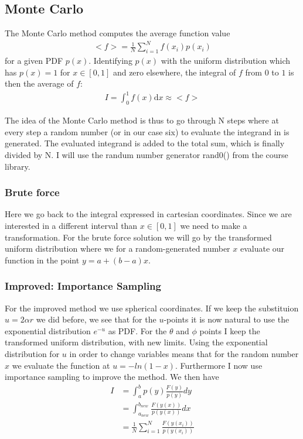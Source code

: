 \documentclass[norsk,a4paper,11pt]{article}
\begin{document}
\subsection{Monte Carlo}
The Monte Carlo method computes the average function value
\begin{align}
    <f> = \frac{1}{N} \sum_{i=1}^{N} f(x_i)p(x_i)
\end{align}
for a given PDF $p(x)$. Identifying $p(x)$ with the uniform distribution which has $p(x)=1$ for $x\in [0, 1]$ and zero elsewhere,
the integral of $f$ from $0$ to $1$ is then the average of $f$:
\begin{align}
    I = \int_0^1 f(x) \mathrm{d}x \approx <f>
\end{align}

The idea of the Monte Carlo method is thus to go through N steps where at every step a random number (or in our case six)
to evaluate the integrand in is generated. The evaluated integrand is added to the total sum, which is finally divided by N.
I will use the randum number generator rand0() from the course library.

\subsubsection{Brute force}
Here we go back to the integral expressed in cartesian coordinates. Since we are interested in a different interval than
$x \in [0,1]$ we need to make a transformation. For the brute force solution we will go by the transformed uniform distribution where
we for a random-generated number $x$ evaluate our function in the point $y = a + (b-a)x$.

\subsubsection{Improved: Importance Sampling}
For the improved method we use spherical coordinates. If we keep the substituion $u=2\alpha r$ we did before,
we see that for the $u$-points it is now natural to use the exponential distribution $e^{-u}$ as PDF. For the
$\theta$ and $\phi$ points I keep the transformed uniform distribution, with new limits.
Using the exponential distribution for $u$ in order to change variables means that for the random number $x$ we evaluate the
function at $u = -ln(1-x)$.
Furthermore I now use importance sampling to improve the method. 
We then have
\begin{align}
    I & = \int_a^b p(y) \frac{F(y)}{p(y)} dy \\
    & = \int_{a_{new}}^{b_{new}} \frac{F(y(x))}{p(y(x))} dx \\
     & = \frac{1}{N} \sum_{i=1}^N \frac{F(y(x_i))}{p(y(x_i))}
\end{align}
\end{document}
